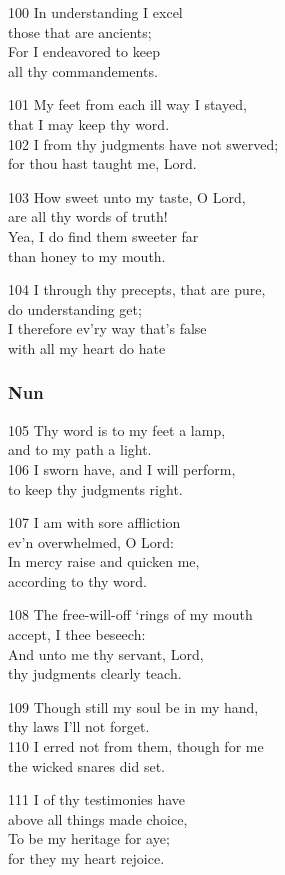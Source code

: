 100 In understanding I excel\\
those that are ancients;\\
For I endeavored to keep\\
all thy commandements.

101 My feet from each ill way I stayed,\\
that I may keep thy word.\\
102 I from thy judgments have not swerved;\\
for thou hast taught me, Lord.

103 How sweet unto my taste, O Lord,\\
are all thy words of truth!\\
Yea, I do find them sweeter far\\
than honey to my mouth.

104 I through thy precepts, that are pure,\\
do understanding get;\\
I therefore ev’ry way that’s false\\
with all my heart do hate

\subsubsection*{Nun}

105 Thy word is to my feet a lamp,\\
and to my path a light.\\
106 I sworn have, and I will perform,\\
to keep thy judgments right.

107 I am with sore affliction\\
ev’n overwhelmed, O Lord:\\
In mercy raise and quicken me,\\
according to thy word.

108 The free-will-off ‘rings of my mouth\\
accept, I thee beseech:\\
And unto me thy servant, Lord,\\
thy judgments clearly teach.

109 Though still my soul be in my hand,\\
thy laws I’ll not forget.\\
110 I erred not from them, though for me\\
the wicked snares did set.

111 I of thy testimonies have\\
above all things made choice,\\
To be my heritage for aye;\\
for they my heart rejoice.


